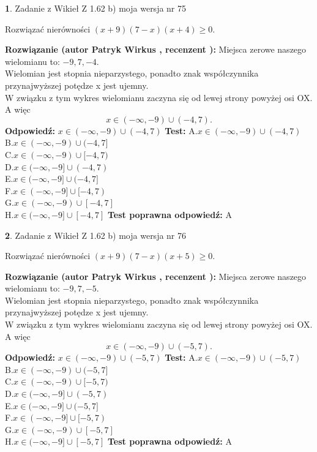 \documentclass[12pt, a4paper]{article}
\theoremstyle{definition} %
\newtheorem{zad}{}
\newcommand{\zadStart}[1]{\begin{zad}#1\newline}
\newcommand{\zadStop}{\end{zad}}
\newcommand{\rozwStart}[2]{\noindent \textbf{Rozwiązanie (autor #1 , recenzent #2): }\newline}
\newcommand{\rozwStop}{\newline}
\newcommand{\odpStart}{\noindent \textbf{Odpowiedź:}\newline}
\newcommand{\odpStop}{\newline}
\newcommand{\testStart}{\noindent \textbf{Test:}\newline}
\newcommand{\testStop}{\newline}
\newcommand{\kluczStart}{\noindent \textbf{Test poprawna odpowiedź:}\newline}
\newcommand{\kluczStop}{\newline}
\begin{document}
\zadStart{Zadanie z Wikieł Z 1.62 b) moja wersja nr 75}

Rozwiązać nierówności $(x+9)(7-x)(x+4)\ge0$.
\zadStop
\rozwStart{Patryk Wirkus}{}
Miejsca zerowe naszego wielomianu to: $-9, 7, -4$.\\
Wielomian jest stopnia nieparzystego, ponadto znak współczynnika przy\linebreak najwyższej potędze x jest ujemny.\\ W związku z tym wykres wielomianu zaczyna się od lewej strony powyżej osi OX. A więc $$x \in (-\infty,-9) \cup (-4,7).$$
\rozwStop
\odpStart
$x \in (-\infty,-9) \cup (-4,7)$
\odpStop
\testStart
A.$x \in (-\infty,-9) \cup (-4,7)$\\
B.$x \in (-\infty,-9) \cup (-4,7]$\\
C.$x \in (-\infty,-9) \cup [-4,7)$\\
D.$x \in (-\infty,-9] \cup (-4,7)$\\
E.$x \in (-\infty,-9] \cup (-4,7]$\\
F.$x \in (-\infty,-9] \cup [-4,7)$\\
G.$x \in (-\infty,-9) \cup [-4,7]$\\
H.$x \in (-\infty,-9] \cup [-4,7]$
\testStop
\kluczStart
A
\kluczStop



\zadStart{Zadanie z Wikieł Z 1.62 b) moja wersja nr 76}

Rozwiązać nierówności $(x+9)(7-x)(x+5)\ge0$.
\zadStop
\rozwStart{Patryk Wirkus}{}
Miejsca zerowe naszego wielomianu to: $-9, 7, -5$.\\
Wielomian jest stopnia nieparzystego, ponadto znak współczynnika przy\linebreak najwyższej potędze x jest ujemny.\\ W związku z tym wykres wielomianu zaczyna się od lewej strony powyżej osi OX. A więc $$x \in (-\infty,-9) \cup (-5,7).$$
\rozwStop
\odpStart
$x \in (-\infty,-9) \cup (-5,7)$
\odpStop
\testStart
A.$x \in (-\infty,-9) \cup (-5,7)$\\
B.$x \in (-\infty,-9) \cup (-5,7]$\\
C.$x \in (-\infty,-9) \cup [-5,7)$\\
D.$x \in (-\infty,-9] \cup (-5,7)$\\
E.$x \in (-\infty,-9] \cup (-5,7]$\\
F.$x \in (-\infty,-9] \cup [-5,7)$\\
G.$x \in (-\infty,-9) \cup [-5,7]$\\
H.$x \in (-\infty,-9] \cup [-5,7]$
\testStop
\kluczStart
A
\kluczStop
\end{document}
